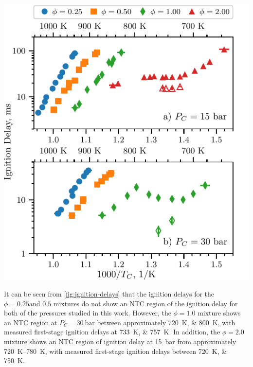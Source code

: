 \documentclass[letterpaper, review, sort&compress]{elsarticle}
\begin{document}
\begin{center}
    \captionsetup{type=figure}
    \includegraphics{figures/ignition-delays.pdf}
    \caption{Ignition delays of MV as a function of inverse temperature for varying equivalence
    ratios. Filled points are the overall ignition delays and hollow points are the first stage
    ignition delays. a) \SI{15}{\bar}, b) \SI{30}{\bar}.}
    \label{fig:ignition-delays}
\end{center}

It can be seen from \cref{fig:ignition-delays} that the ignition delays for the \(\phi=0.25\text{
and } 0.5\) mixtures do not show an NTC region of the ignition delay for both of the pressures
studied in this work. However, the \(\phi=1.0\) mixture shows an NTC region at
\(P_C=\SI[number-unit-product={\ }]{30}{\bar}\) between approximately \SIlist{720;800}{\K}, with
measured first-stage ignition delays at \SIlist{733;757}{\K}. In addition, the \(\phi=2.0\) mixture
shows an NTC region of ignition delay at \SI{15}{\bar} from approximately \SIrange{720}{780}{\K},
with measured first-stage ignition delays between \SIlist{720;750}{\K}.
\end{document}
